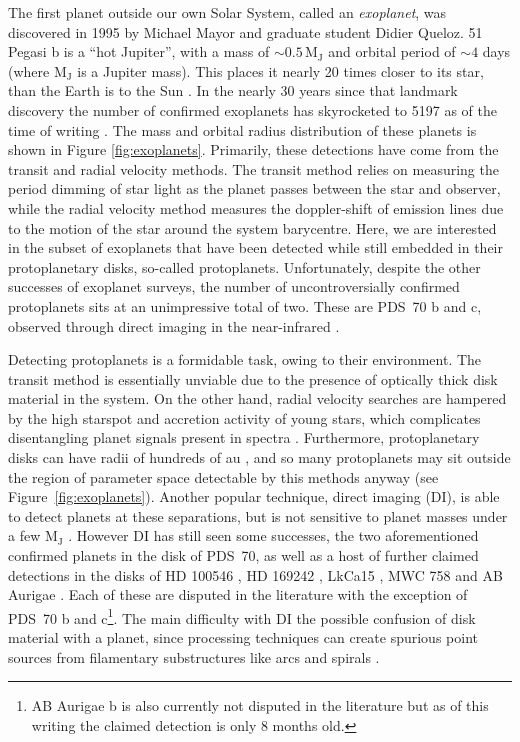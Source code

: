 The first planet outside our own Solar System, called an \textit{exoplanet}, was discovered in 1995 by Michael Mayor and graduate student Didier Queloz.
51 Pegasi b is a ``hot Jupiter'', with a mass of $\sim 0.5 \, \mathrm{M_J}$ and orbital period of $\sim 4$ days (where $\mathrm{M_J}$ is a Jupiter mass).
This places it nearly 20 times closer to its star, than the Earth is to the Sun \citep{mayor1995}.
In the nearly 30 years since that landmark discovery the number of confirmed exoplanets has skyrocketed to 5197 as of the time of writing \citep{nasa2022}.
The mass and orbital radius distribution of these planets is shown in Figure \ref{fig:exoplanets}.
Primarily, these detections have come from the transit and radial velocity methods.
The transit method relies on measuring the period dimming of star light as the planet passes between the star and observer, while the radial velocity method measures the doppler-shift of emission lines due to the motion of the star around the system barycentre.
Here, we are interested in the subset of exoplanets that have been detected while still embedded in their protoplanetary disks, so-called protoplanets.
Unfortunately, despite the other successes of exoplanet surveys, the number of uncontroversially confirmed protoplanets sits at an unimpressive total of two.
These are PDS~70 b and c, observed through direct imaging in the near-infrared \citep{keppler2018,haffert2019}.

Detecting protoplanets is a formidable task, owing to their environment.
The transit method is essentially unviable due to the presence of optically thick disk material in the system.
On the other hand, radial velocity searches are hampered by the high starspot and accretion activity of young stars, which complicates disentangling planet signals present in spectra \citep{desort2007}.
Furthermore, protoplanetary disks can have radii of hundreds of au \citep[e.g.][]{tripathi2017}, and so many protoplanets may sit outside the region of parameter space detectable by this methods anyway (see Figure~\ref{fig:exoplanets}).
Another popular technique, direct imaging (DI), is able to detect planets at these separations, but is not sensitive to planet masses under a few $\mathrm{M_J}$ \citep{jorquera2021}.
However DI has still seen some successes, the two aforementioned confirmed planets in the disk of PDS~70, as well as a host of further claimed detections in the disks of HD 100546 \citep{quanz2013}, HD 169242 \citep{biller2014}, LkCa15 \citep{sallum2015}, MWC 758 \citep{reggiani2018} and AB Aurigae \citep{currie2022}. Each of these are disputed in the literature \citep{rameau2017,ligi2018,currie2019} with the exception of PDS~70 b and c\footnote{AB Aurigae b is also currently not disputed in the literature but as of this writing the claimed detection is only 8 months old.}.
The main difficulty with DI the possible confusion of disk material with a planet, since processing techniques can create spurious point sources from filamentary substructures like arcs and spirals \citep[eg.][]{rameau2017}.

